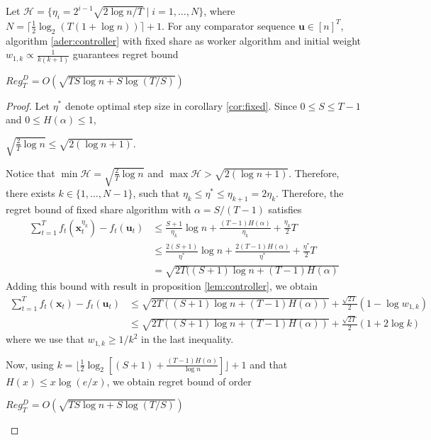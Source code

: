 \documentclass[12pt, a4paper]{report}
\begin{document}
\begin{prop}
Let $\mathcal{H} = \{ \eta_i = 2^{i-1}\sqrt{2 \log n / T} \mid i = 1, \dots, N \}$, where $N = \lceil \frac{1}{2} \log_2 (T(1 + \log n))\rceil + 1$. For any comparator sequence $\mathbf{u} \in [n]^T$, algorithm \ref{ader:controller} with fixed share as worker algorithm and initial weight $w_{1, k} \propto \frac{1}{k(k+1)}$ guarantees regret bound
\begin{center}
$Reg_T^D = O(\sqrt{TS\log n +S\log(T/S)})$
\end{center}
\end{prop}
\begin{proof}
Let $\eta^*$ denote optimal step size in corollary \ref{cor:fixed}. Since $0 \leq S \leq T-1$ and $0 \leq H(\alpha) \leq 1$,
\begin{center}
    $\displaystyle \sqrt{\frac{2}{T} \log n} \leq \sqrt{2(\log n + 1)}$.
\end{center}
Notice that $\min \mathcal{H} = \sqrt{\frac{2}{T} \log n}$ and $\max \mathcal{H} > \sqrt{2 (\log n + 1)}$. Therefore, there exists $k \in \{1, \dots, N-1\}$, such that $\eta_k \leq \eta^* \leq \eta_{k+1} = 2\eta_k$. Therefore, the regret bound of fixed share algorithm with $\alpha = S / (T - 1)$ satisfies
\begin{align*}
    \sum_{t=1}^T f_t(\mathbf{x}_t^{\eta_k}) - f_t(\mathbf{u}_t) &\leq \frac{S+1}{\eta_k} \log n + \frac{(T-1)H(\alpha)}{\eta_k} + \frac{\eta_k}{2}T 
    \\
    & \leq \frac{2(S+1)}{\eta^*} \log n + \frac{2(T-1)H(\alpha)}{\eta^*} + \frac{\eta^*}{2}T
    \\
    &= \sqrt{2T((S+1) \log n + (T-1) H(\alpha)}
\end{align*}
Adding this bound with result in proposition \ref{lem:controller}, we obtain
\begin{align*}
    \sum_{t=1}^T f_t(\mathbf{x}_t) - f_t(\mathbf{u}_t) &\leq \sqrt{2T((S+1)\log n + (T-1)H(\alpha))} + \frac{\sqrt{2T}}{2}(1 - \log w_{1, k})
    \\
    &\leq\sqrt{2T((S+1)\log n + (T-1)H(\alpha))} + \frac{\sqrt{2T}}{2}(1 + 2 \log k)
\end{align*}
where we use that $w_{1, k} \geq 1/k^2$ in the last inequality. 

Now, using $k = \lfloor \frac{1}{2} \log_2 \left[ (S+1) + \frac{(T-1)H(\alpha)}{\log n}\right]\rfloor + 1$ and that $H(x) \leq x \log (e/x)$, we obtain regret bound of order 
\begin{center}
    $\displaystyle Reg_T^D = O(\sqrt{TS\log n +S\log(T/S)})$
\end{center}
\end{proof}
\end{document}
